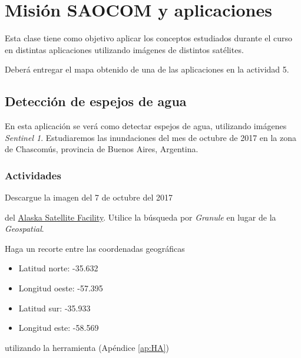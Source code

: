 \chapter{Misión SAOCOM y aplicaciones}
Esta clase tiene como objetivo aplicar los conceptos estudiados durante el curso en distintas aplicaciones utilizando imágenes de distintos satélites.

Deberá entregar el mapa obtenido de una de las aplicaciones en la actividad 5.

\section{Detección de espejos de agua}

En esta aplicación se verá como detectar espejos de agua, utilizando imágenes \emph{Sentinel 1}. Estudiaremos las inundaciones del mes de octubre de 2017 en la zona de Chascomús, provincia de Buenos Aires, Argentina.



\subsection{Actividades}

\begin{que}
    Descargue la imagen del 7 de octubre del 2017
    \begin{center}\end{center} del \href{https://vertex.daac.asf.alaska.edu/}{Alaska Satellite Facility}. Utilice la búsqueda por \emph{Granule} en lugar de la \emph{Geospatial}.
\end{que}

\begin{que}
    Haga un recorte entre las coordenadas geográficas
    \begin{itemize}
        \item Latitud norte: -35.632
        \item Longitud oeste: -57.395
        \item Latitud sur: -35.933
        \item Longitud este: -58.569
    \end{itemize}
    utilizando la herramienta  (Apéndice \ref{ap:HA})
\end{que}

